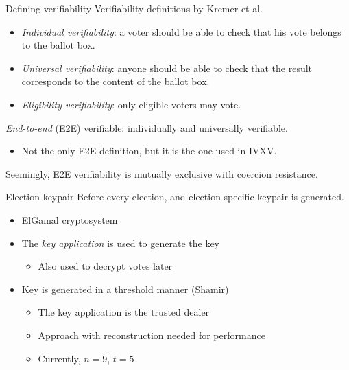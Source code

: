 \begin{frame}{Defining verifiability}
  Verifiability definitions by Kremer et al.
  \begin{itemize}[<+(1)->]
    \item \emph{Individual verifiability}: a voter should be able to check that his vote belongs to the ballot box.
    \item \emph{Universal verifiability}: anyone should be able to check that the result corresponds to the content of the ballot box.
    \item \emph{Eligibility verifiability}: only eligible voters may vote.
  \end{itemize}

  \pause
  \emph{End-to-end} (E2E) verifiable: individually and universally verifiable.
  \begin{itemize}
    \item Not the only E2E definition, but it is the one used in IVXV.
  \end{itemize}

  \pause
  Seemingly, E2E verifiability is mutually exclusive with coercion resistance.
\end{frame}

\begin{frame}{Election keypair}
  Before every election, and election specific keypair is generated.
  \begin{itemize}[<+(1)->]
    \item ElGamal cryptosystem
    \item The \emph{key application} is used to generate the key
    \begin{itemize}
      \item Also used to decrypt votes later
    \end{itemize}
    \item Key is generated in a threshold manner (Shamir)
    \begin{itemize}
      \item The key application is the trusted dealer
      \item Approach with reconstruction needed for performance
      \item Currently, $n = 9$, $t = 5$
    \end{itemize}
  \end{itemize}
\end{frame}

